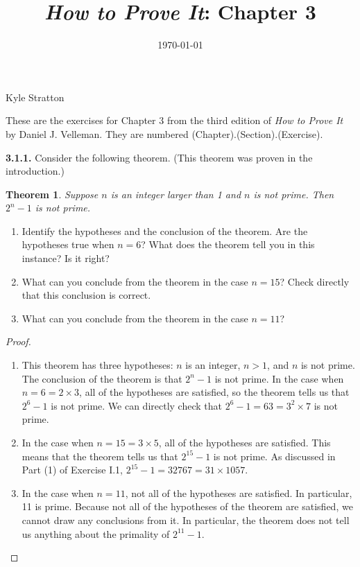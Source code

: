 \documentclass[12pt]{amsart}
\title{\emph{How to Prove It}: Chapter 3} %
\date{\today}
\newenvironment{statement}[1]{\smallskip\noindent\color[rgb]{.6627, .3529, .6314} {\bf #1.}}{}
\newtheorem{theorem}{Theorem}
\theoremstyle{definition}
\theoremstyle{remark}
\begin{document}
\maketitle

\vspace*{-0.25in}
\centerline{Kyle Stratton}

\begin{framed}
These are the exercises for Chapter 3 from the third edition of \emph{How to Prove It} by Daniel J. Velleman.
They are numbered (Chapter).(Section).(Exercise).
\end{framed}

\begin{statement}{3.1.1}
Consider the following theorem.
(This theorem was proven in the introduction.)
\begin{theorem}
	Suppose $n$ is an integer larger than 1 and $n$ is not prime.
	Then $2^n - 1$ is not prime.
\end{theorem}
\begin{enumerate}
	\item Identify the hypotheses and the conclusion of the theorem.
	Are the hypotheses true when $n = 6$?
	What does the theorem tell you in this instance?
	Is it right?
	
	\item What can you conclude from the theorem in the case $n = 15$?
	Check directly that this conclusion is correct.
	
	\item What can you conclude from the theorem in the case $n = 11$?
\end{enumerate}
\end{statement}

\begin{proof}
\hfill
\begin{enumerate}
	\item This theorem has three hypotheses: $n$ is an integer, $n > 1$, and $n$ is not prime.
	The conclusion of the theorem is that $2^n - 1$ is not prime.
	In the case when $n = 6 = 2 \times 3$, all of the hypotheses are satisfied,
	so the theorem tells us that $2^6 - 1$ is not prime.
	We can directly check that $2^6 - 1 = 63 = 3^2 \times 7$ is not prime.
	
	\item In the case when $n = 15 = 3 \times 5$, all of the hypotheses are satisfied.
	This means that the theorem tells us that $2^{15} - 1$ is not prime.
	As discussed in Part (1) of Exercise I.1, $2^{15} - 1 = 32767 = 31 \times 1057$.
	
	\item In the case when $n = 11$, not all of the hypotheses are satisfied.
	In particular, 11 is prime.
	Because not all of the hypotheses of the theorem are satisfied,
	we cannot draw any conclusions from it.
	In particular, the theorem does not tell us anything about the primality of $2^{11} - 1$.
\end{enumerate}
\end{proof}
\end{document}
